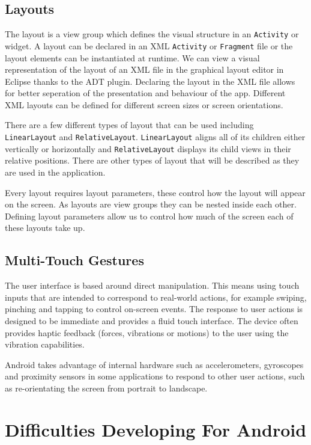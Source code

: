 \documentclass{report}
\begin{document}
\subsection{Layouts}
\label{sub:layouts}

The layout is a view group which defines the visual structure in an {\tt Activity} or widget. A layout can be declared in an XML {\tt Activity} or {\tt Fragment} file or the layout elements can be instantiated at runtime. We can view a visual representation of the layout of an XML file in the graphical layout editor in Eclipse thanks to the ADT plugin. Declaring the layout in the XML file allows for better seperation of the presentation and behaviour of the app. Different XML layouts can be defined for different screen sizes or screen orientations. 

There are a few different types of layout that can be used including {\tt LinearLayout} and {\tt RelativeLayout}. {\tt LinearLayout} aligns all of its children either vertically or horizontally and {\tt RelativeLayout} displays its child views in their relative positions. There are other types of layout that will be described as they are used in the application.

Every layout requires layout parameters, these control how the layout will appear on the screen. As layouts are view groups they can be nested inside each other. Defining layout parameters allow us to control how much of the screen each of these layouts take up.

\subsection{Multi-Touch Gestures}
\label{sub:gestures}

The user interface is based around direct manipulation. This means using touch inputs that are intended to correspond to real-world actions, for example swiping, pinching and tapping to control on-screen events. The response to user actions is designed to be immediate and provides a fluid touch interface. The device often provides haptic feedback (forces, vibrations or motions) to the user using the vibration capabilities.

Android takes advantage of internal hardware such as accelerometers, gyroscopes and proximity sensors in some applications to respond to other user actions, such as re-orientating the screen from portrait to landscape.

\section{Difficulties Developing For Android}
\end{document}
